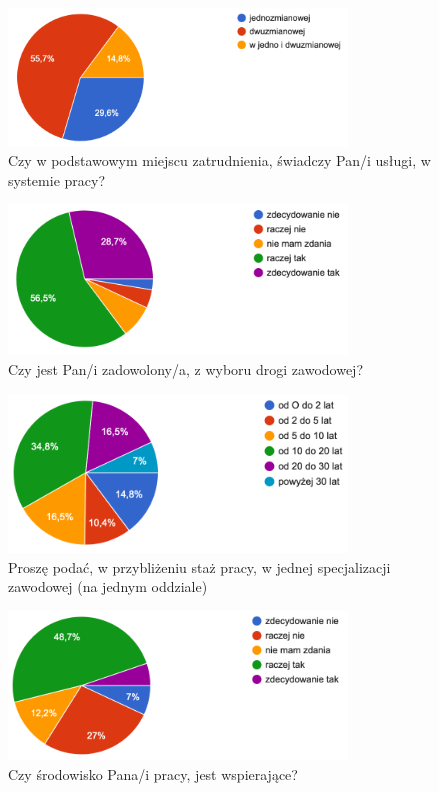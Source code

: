 \begin{figure}
    \includegraphics[width=9cm]{wyniki/04_ile_zmian}
    \caption{Czy w podstawowym miejscu zatrudnienia, świadczy  Pan/i usługi, w systemie pracy?}
    \label{rys:ile_zmian}
\end{figure}

\begin{figure}
    \includegraphics[width=9cm]{wyniki/05_zadowol}
    \caption{Czy jest Pan/i zadowolony/a, z wyboru drogi zawodowej?}
    \label{rys:zadowol}
\end{figure}

\begin{figure}
    \includegraphics[width=9cm]{wyniki/06_staz_w_spec}
    \caption{Proszę podać, w przybliżeniu staż pracy, w jednej specjalizacji zawodowej (na jednym oddziale)}
    \label{rys:staz_spec}
\end{figure}

\begin{figure}
    \includegraphics[width=9cm]{wyniki/07_srod_wspiera}
    \caption{Czy środowisko Pana/i pracy, jest wspierające?}
    \label{rys:wspiera}
\end{figure}

